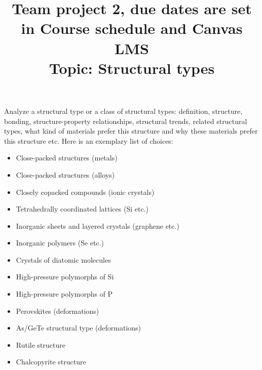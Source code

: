 \documentclass[11pt]{Project}
\begin{document}
\title{Team project 2, due dates are set in Course schedule and Canvas LMS \\ Topic: Structural types}
\maketitle

Analyze a structural type or a class of structural types: definition, structure, bonding, structure-property relationships, structural trends, related structural types, what kind of materials prefer this structure and why these materials prefer this structure etc. Here is an exemplary list of choices:

\begin{itemize}
\item Close-packed structures (metals)
\item Close-packed structures (alloys)
\item Closely copacked compounds (ionic crystals)
\item Tetrahedrally coordinated lattices (Si etc.)
\item Inorganic sheets and layered crystals (graphene etc.)
\item Inorganic polymers (Se etc.)
\item Crystals of diatomic molecules
\item High-pressure polymorphs of Si
\item High-pressure polymorphs of P
\item Perovskites (deformations)
\item As/GeTe structural type (deformations)
\item Rutile structure
\item Chalcopyrite structure
\end{itemize}

\reminder{}
\end{document}

